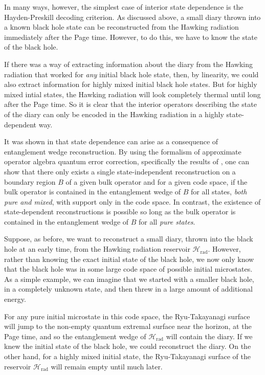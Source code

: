 \documentclass[12pt]{article}
\begin{document}
In many ways, however, the simplest case of interior state dependence is the Hayden-Preskill decoding criterion. As discussed above, a small diary thrown into a known black hole state can be reconstructed from the Hawking radiation immediately after the Page time. However, to do this, we have to know the state of the black hole. 

If there was a way of extracting information about the diary from the Hawking radiation that worked for \emph{any} initial black hole state, then, by linearity, we could also extract information for highly mixed initial black hole states. But for highly mixed intial states, the Hawking radiation will look completely thermal until long after the Page time. So it is clear that the interior operators describing the state of the diary can only be encoded in the Hawking radiation in a highly state-dependent way.

It was shown in \cite{hayden2018learning} that state dependence can arise as a consequence of entanglement wedge reconstruction. By using the formalism of approximate operator algebra quantum error correction, specifically the results of \cite{beny2007generalization, beny2009conditions, beny2010general}, one can show that there only exists a single state-independent reconstruction on a boundary region $B$ of a given bulk operator and for a given code space, if the bulk operator is contained in the entanglement wedge of $B$ for all states, \emph{both pure and mixed}, with support only in the code space. In contrast, the existence of state-dependent reconstructions is possible so long as the bulk operator is contained in the entanglement wedge of $B$ for all \emph{pure states}.

Suppose, as before, we want to reconstruct a small diary, thrown into the black hole at an early time, from the Hawking radiation reservoir $\mathcal{H}_\text{rad}$. However, rather than knowing the exact initial state of the black hole, we now only know that the black hole was in some large code space of possible initial microstates. As a simple example, we can imagine that we started with a smaller black hole, in a completely unknown state, and then threw in a large amount of additional energy.

For any pure initial microstate in this code space, the Ryu-Takayanagi surface will jump to the non-empty quantum extremal surface near the horizon, at the Page time, and so the entanglement wedge of $\mathcal{H}_\text{rad}$ will contain the diary. If we knew the initial state of the black hole, we could reconstruct the diary. On the other hand, for a highly mixed initial state, the Ryu-Takayanagi surface of the reservoir $\mathcal{H}_\text{rad}$ will remain empty until much later. 
\end{document}
